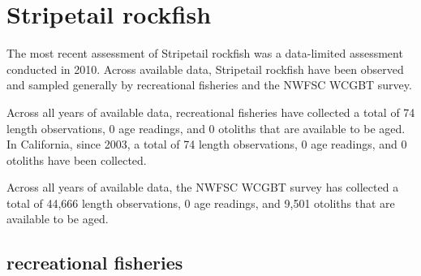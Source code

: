 \documentclass[11pt,
  english,
  letterpaper,
]{article}
\begin{document}

\hypertarget{stripetail-rockfish}{%
\section{Stripetail rockfish}\label{stripetail-rockfish}}

\leavevmode\tagmcend\tagstructend


The most recent assessment of Stripetail rockfish was a data-limited assessment conducted in 2010. Across available data, Stripetail rockfish have been observed and sampled generally by recreational fisheries and the NWFSC WCGBT survey.

\leavevmode\tagmcend\tagstructend\par


Across all years of available data, recreational fisheries have collected a total of 74 length observations, 0 age readings, and 0 otoliths that are available to be aged. In California, since 2003, a total of 74 length observations, 0 age readings, and 0 otoliths have been collected.

\leavevmode\tagmcend\tagstructend\par


Across all years of available data, the NWFSC WCGBT survey has collected a total of 44,666 length observations, 0 age readings, and 9,501 otoliths that are available to be aged.

\leavevmode\tagmcend\tagstructend\par


\hypertarget{recreational-fisheries-37}{%
\subsection{recreational fisheries}\label{recreational-fisheries-37}}

\leavevmode\tagmcend\tagstructend


\begingroup\fontsize{10}{12}\selectfont \begingroup\fontsize{10}{12}\selectfont

\leavevmode\tagmcend\tagstructend\par
\end{document}
